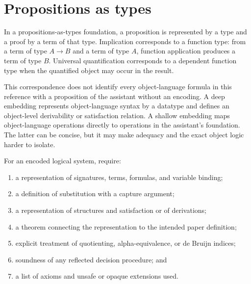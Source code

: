 \section{Propositions as types}
\label{sec:mechanization-02}

In a propositions-as-types foundation, a proposition is represented by a type
and a proof by a term of that type.  Implication corresponds to a function type:
from a term of type \(A\to B\) and a term of type \(A\), function application
produces a term of type \(B\).  Universal quantification corresponds to a
dependent function type when the quantified object may occur in the result.

This correspondence does not identify every object-language formula in this
reference with a proposition of the assistant without an encoding.  A deep
embedding represents object-language syntax by a datatype and defines an
object-level derivability or satisfaction relation.  A shallow embedding maps
object-language operations directly to operations in the assistant's
foundation.  The latter can be concise, but it may make adequacy and the exact
object logic harder to isolate.

\begin{method}
For an encoded logical system, require:
\begin{enumerate}
  \item a representation of signatures, terms, formulas, and variable binding;
  \item a definition of substitution with a capture argument;
  \item a representation of structures and satisfaction or of derivations;
  \item a theorem connecting the representation to the intended paper
        definition;
  \item explicit treatment of quotienting, alpha-equivalence, or de Bruijn
        indices;
  \item soundness of any reflected decision procedure; and
  \item a list of axioms and unsafe or opaque extensions used.
\end{enumerate}
\end{method}

